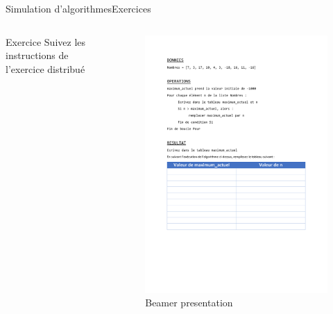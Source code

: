 \documentclass{beamer}
\begin{document}
\begin{frame}{Simulation d'algorithmes}{Exercices}
	\begin{columns}
		\begin{column}{0.5\textwidth}
			\begin{alertblock}{Exercice}
				Suivez les instructions de l'exercice distribué
			\end{alertblock}
		\end{column}
		\begin{column}{0.5\textwidth}
			\begin{figure}
				\includegraphics[width=1\linewidth]{ExerciceSimulationAlgorithme.pdf}
				\caption{Beamer presentation}
			\end{figure}
		\end{column}
	\end{columns}
\end{frame}
\end{document}
